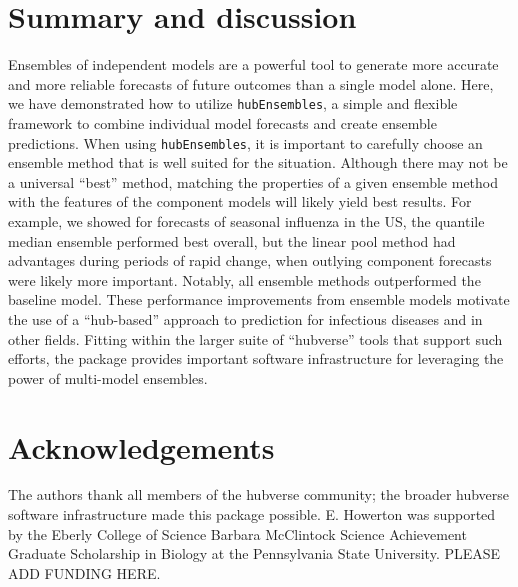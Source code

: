 \documentclass[
  article,
  shortnames,
  notitle]{jss}
\begin{document}
\section{Summary and discussion}\label{sec-conclusions}

Ensembles of independent models are a powerful tool to generate more
accurate and more reliable forecasts of future outcomes than a single
model alone. Here, we have demonstrated how to utilize
\texttt{hubEnsembles}, a simple and flexible framework to combine
individual model forecasts and create ensemble predictions. When using
\texttt{hubEnsembles}, it is important to carefully choose an ensemble
method that is well suited for the situation. Although there may not be
a universal ``best'' method, matching the properties of a given ensemble
method with the features of the component models will likely yield best
results. For example, we showed for forecasts of seasonal influenza in
the US, the quantile median ensemble performed best overall, but the
linear pool method had advantages during periods of rapid change, when
outlying component forecasts were likely more important. Notably, all
ensemble methods outperformed the baseline model. These performance
improvements from ensemble models motivate the use of a ``hub-based''
approach to prediction for infectious diseases and in other fields.
Fitting within the larger suite of ``hubverse'' tools that support such
efforts, the  package provides important software
infrastructure for leveraging the power of multi-model ensembles.

\section*{Acknowledgements}\label{acknowledgements}

The authors thank all members of the hubverse community; the broader
hubverse software infrastructure made this package possible. E. Howerton
was supported by the Eberly College of Science Barbara McClintock
Science Achievement Graduate Scholarship in Biology at the Pennsylvania
State University. PLEASE ADD FUNDING HERE.


\renewcommand\refname{References}
  
\end{document}
